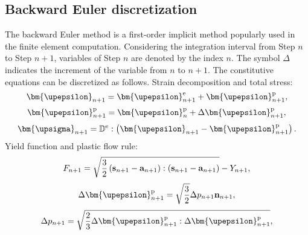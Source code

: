 \subsection{Backward Euler discretization}
\noindent
The backward Euler method is a first-order implicit method popularly used in the finite element computation. Considering the integration interval from Step $n$ to Step $n+1$, variables of Step $n$ are denoted by the index $n$. The symbol $\Delta$ indicates the increment of the variable from $n$ to $n+1$. The constitutive equations can be discretized as follows.
Strain decomposition and total stress:
\begin{equation}
{{\bm{\upepsilon }}_{n + 1}} = {\bm{\upepsilon }}_{n + 1}^{\rm{e}} + {\bm{\upepsilon }}_{n + 1}^{\rm{p}},
\end{equation}
\begin{equation}
{\bm{\upepsilon }}_{n + 1}^{\rm{p}} = {\bm{\upepsilon }}_n^{\rm{p}} + \Delta {\bm{\upepsilon }}_{n + 1}^{\rm{p}},
\end{equation}
\begin{equation}
\label{Equ:sigman+1}
{{\bm{\upsigma }}_{n + 1}} = {\mathbb{D}^{\rm{e}}}:\left( {{{\bm{\upepsilon }}_{n + 1}} - {\bm{\upepsilon }}_{n + 1}^{\rm{p}}} \right).
\end{equation}
Yield function and plastic flow rule:
\begin{equation}
\label{Equ:Fn+1}
{F_{n + 1}} = \sqrt {\frac{3}{2}\left( {{{\bf{s}}_{n + 1}} - {{\bf{a}}_{n + 1}}} \right):\left( {{{\bf{s}}_{n + 1}} - {{\bf{a}}_{n + 1}}} \right)}  - {Y_{n + 1}},
\end{equation}
\begin{equation}
\label{Equ:epsilonpn+1}
\Delta {\bm{\upepsilon }}_{n + 1}^{\rm{p}} = \sqrt {\frac{3}{2}} \Delta {p_{n + 1}}{{\bf{n}}_{n + 1}},
\end{equation}
\begin{equation}
\label{Equ:pn+1}
\Delta {p_{n + 1}} = \sqrt {\frac{2}{3}\Delta {\bm{\upepsilon }}_{n + 1}^{\rm{p}}:\Delta {\bm{\upepsilon }}_{n + 1}^{\rm{p}}},
\end{equation}
